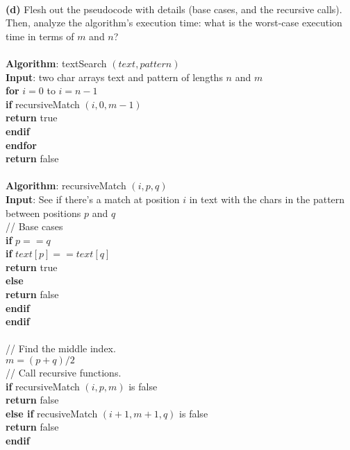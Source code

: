 \documentclass{article}
\begin{document}
	\\
	\textbf{(d)} Flesh out the pseudocode with details (base cases, and the recursive calls). Then, analyze the algorithm's execution time: what is the worst-case execution time in terms of $m$ and $n$? \\
	\\
	\textbf{Algorithm}: textSearch $(text, pattern)$ \\
	\textbf{Input}: two char arrays text and pattern of lengths $n$ and $m$\\
	\indent \textbf{for} $i=0$ to $i=n-1$\\
	\indent \indent \textbf{if} recursiveMatch $(i, 0, m-1)$\\
	\indent \indent \indent \textbf{return} true\\
	\indent \indent \textbf{endif}\\
	\indent \textbf{endfor}\\
	\indent \textbf{return} false\\
	\\
	\textbf{Algorithm}: recursiveMatch $(i, p, q)$\\
	\textbf{Input}: See if there's a match at position $i$ in text with the chars in the pattern between positions $p$ and $q$ \\
	\indent // Base cases\\
	\indent \textbf{if} $p == q$ \\
	\indent \indent \textbf{if} $text[p] == text[q]$ \\
	\indent \indent \indent \textbf{return} true \\
	\indent \indent \textbf{else} \\
	\indent \indent \indent \textbf{return} false \\
	\indent \indent \textbf{endif} \\
	\indent \textbf {endif}\\
	\\
	\indent // Find the middle index. \\
	\indent $m = (p+q)/2$ \\
	\indent // Call recursive functions. \\
	\indent \textbf{if} recursiveMatch $(i, p, m)$ is false \\
	\indent \indent \textbf{return} false \\
	\indent \textbf{else if} \indent recusiveMatch $(i+1, m+1, q)$ is false \\ 
	\indent \indent \textbf{return} false \\
	\indent \textbf{endif} \\
\end{document}
